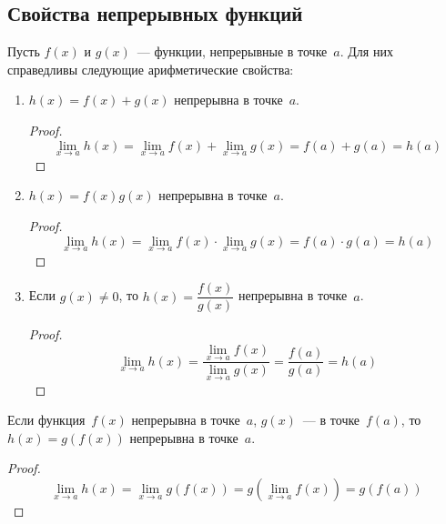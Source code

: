 \subsection{Свойства непрерывных функций}
Пусть $f(x)$ и $g(x)$~--- функции, непрерывные в точке~$a$.
Для них справедливы следующие арифметические свойства:
\begin{enumerate}
	\item $h(x) = f(x) + g(x)$ непрерывна в точке~$a$.
	\begin{proof}
	\begin{equation*}
	\lim_{x \to a} h(x) =
	\lim_{x \to a} f(x) + \lim_{x \to a} g(x) =
	f(a) + g(a) =
	h(a)
	\end{equation*}
	\end{proof}
	
	\item $h(x) = f(x)g(x)$ непрерывна в точке~$a$.
	\begin{proof}
	\begin{equation*}
	\lim_{x \to a} h(x) =
	\lim_{x \to a} f(x) \cdot \lim_{x \to a} g(x) =
	f(a) \cdot g(a) =
	h(a)
	\end{equation*}
	\end{proof}
	
	\item Если $g(x) \neq 0$, то $h(x) = \dfrac{f(x)}{g(x)}$ непрерывна в точке~$a$.
	\begin{proof}
	\begin{equation*}
	\lim_{x \to a} h(x) =
	\frac{\lim_{x \to a} f(x)}{\lim_{x \to a} g(x)} =
	\frac{f(a)}{g(a)} =
	h(a)
	\end{equation*}
	\end{proof}
\end{enumerate}

\begin{statement}
Если функция~$f(x)$ непрерывна в точке~$a$, $g(x)$~--- в точке~$f(a)$, то $h(x) = g(f(x))$ непрерывна в точке~$a$.
\end{statement}
\begin{proof}
\begin{equation*}
\lim_{x \to a} h(x) = \lim_{x \to a} g(f(x)) = g(\lim_{x \to a} f(x)) = g(f(a))
\end{equation*}
\end{proof}


